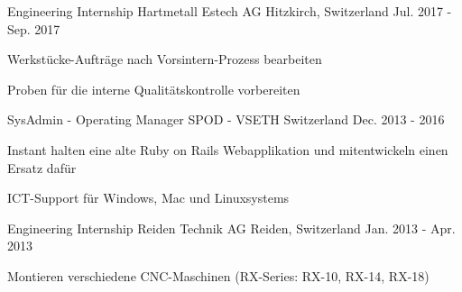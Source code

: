 

\begin{cventries}
	
\cventry
{Engineering Internship} %
{Hartmetall Estech AG} %
{Hitzkirch, Switzerland} %
{Jul. 2017 - Sep. 2017} %
{
	\begin{cvitems} %
		\item {Werkstücke-Aufträge nach Vorsintern-Prozess bearbeiten}
		\item {Proben für die interne Qualitätskontrolle vorbereiten}
	\end{cvitems}
}

  \cventry
    {SysAdmin - Operating Manager} %
    {SPOD - VSETH} %
    {Switzerland} %
    {Dec. 2013 - 2016} %
    {
      \begin{cvitems} %
        \item {Instant halten eine alte Ruby on Rails Webapplikation und mitentwickeln einen Ersatz dafür}
        \item {ICT-Support für Windows, Mac und Linuxsystems}
      \end{cvitems}
    }

  \cventry
    {Engineering Internship} %
    {Reiden Technik AG} %
    {Reiden, Switzerland} %
    {Jan. 2013 - Apr. 2013} %
    {
      \begin{cvitems} %
        \item {Montieren verschiedene CNC-Maschinen (RX-Series: RX-10, RX-14, RX-18)}
      \end{cvitems}
    }


\end{cventries}
